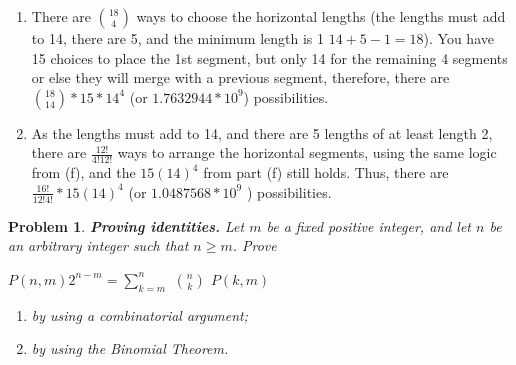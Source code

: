 \documentclass{article}
\newtheorem{problem}{Problem}
\theoremstyle{definition}
\begin{document}
\begin{enumerate}[label = \alph*)]
    \item
    There are $\binom{18}{4}$ ways to choose the horizontal lengths (the lengths must add to 14, there are 5, and the minimum length is 1 $14+5-1 = 18$). You have 15 choices to place the 1st segment, but only 14 for the remaining 4 segments or else they will merge with a previous segment, therefore, there are $\binom{18}{14}*15*14^4$ (or $1.7632944*10^9$) possibilities.
    
    \item
    As the lengths must add to 14, and there are 5 lengths of at least length 2, there are $\frac{12!}{4!12!}$ ways to arrange the horizontal segments, using the same logic from (f), and the $15(14)^4$ from part (f) still holds. Thus, there are $\frac{16!}{12!4!} * 15(14)^4$ (or $1.0487568*10^9$ ) possibilities.
\end{enumerate}

\begin{problem}\textbf{Proving identities. }
Let $m$ be a fixed positive integer, and let $n$ be an arbitrary integer such that $n\ge m$. Prove\\
\centerline{$P(n,m)2^{n-m} = \sum^{n}_{k=m}$ $\binom{n}{k}$  $P(k,m)$}
\begin{enumerate}[label = \alph*)]
    \item by using a combinatorial argument;
    
    \item by using the Binomial Theorem.
\end{enumerate}
\end{problem}
\end{document}

